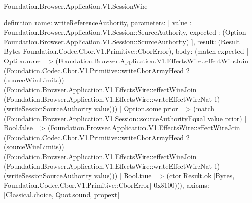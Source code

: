 \begin{lexlean}{Foundation.Browser.Application.V1.SessionWire}
\begin{semanticmodule}
definition{
  name: writeReferenceAuthority,
  parameters: [
    value : Foundation.Browser.Application.V1.Session::SourceAuthority,
    expected : (Option Foundation.Browser.Application.V1.Session::SourceAuthority)
  ],
  result: (Result Bytes Foundation.Codec.Cbor.V1.Primitive::CborError),
  body: (match expected
    | Option.none => (Foundation.Browser.Application.V1.EffectsWire::effectWireJoin (Foundation.Codec.Cbor.V1.Primitive::writeCborArrayHead 2 (sourceWireLimits)) (Foundation.Browser.Application.V1.EffectsWire::effectWireJoin (Foundation.Browser.Application.V1.EffectsWire::writeEffectWireNat 1) (writeSessionSourceAuthority value)))
    | Option.some prior => (match (Foundation.Browser.Application.V1.Session::sourceAuthorityEqual value prior)
      | Bool.false => (Foundation.Browser.Application.V1.EffectsWire::effectWireJoin (Foundation.Codec.Cbor.V1.Primitive::writeCborArrayHead 2 (sourceWireLimits)) (Foundation.Browser.Application.V1.EffectsWire::effectWireJoin (Foundation.Browser.Application.V1.EffectsWire::writeEffectWireNat 1) (writeSessionSourceAuthority value)))
      | Bool.true => (ctor Result.ok [Bytes, Foundation.Codec.Cbor.V1.Primitive::CborError] 0x8100))),
  axioms: [Classical.choice, Quot.sound, propext]
}


\end{semanticmodule}
\end{lexlean}
